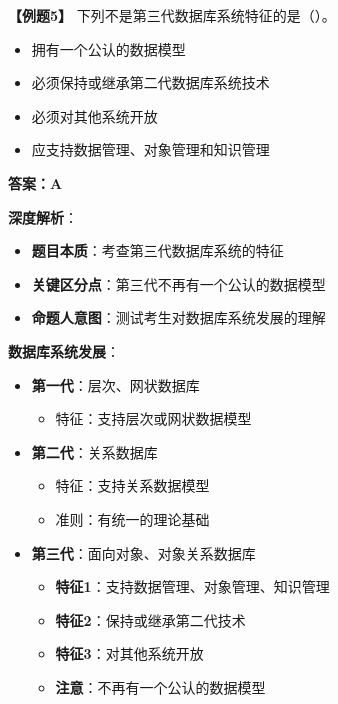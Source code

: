 \documentclass[12pt, a4paper]{article}
\newenvironment{bluebox}[1]{%
  \begin{trivlist}
  \item[\hskip\labelsep \textbf{#1}]
  \setlength{\parskip}{0.5ex}
  \setlength{\itemsep}{0.5ex}
}{%
  \end{trivlist}
  }
\begin{document}
\begin{bluebox}{例题5：第三代数据库系统}
	\textbf{【例题5】} 下列不是第三代数据库系统特征的是（\quad）。

	\begin{itemize}
		\item[A)] 拥有一个公认的数据模型
		\item[B)] 必须保持或继承第二代数据库系统技术
		\item[C)] 必须对其他系统开放
		\item[D)] 应支持数据管理、对象管理和知识管理
	\end{itemize}

	\textbf{答案：A}

	\textbf{深度解析}：

	\begin{itemize}[leftmargin=*, nosep]
		\item \textbf{题目本质}：考查第三代数据库系统的特征
		\item \textbf{关键区分点}：第三代不再有一个公认的数据模型
		\item \textbf{命题人意图}：测试考生对数据库系统发展的理解
	\end{itemize}

	\textbf{数据库系统发展}：

	\begin{itemize}[leftmargin=*, nosep]
		\item \textbf{第一代}：层次、网状数据库
		      \begin{itemize}[nosep]
			      \item 特征：支持层次或网状数据模型
		      \end{itemize}

		\item \textbf{第二代}：关系数据库
		      \begin{itemize}[nosep]
			      \item 特征：支持关系数据模型
			      \item 准则：有统一的理论基础
		      \end{itemize}

		\item \textbf{第三代}：面向对象、对象关系数据库
		      \begin{itemize}[nosep]
			      \item \textbf{特征1}：支持数据管理、对象管理、知识管理
			      \item \textbf{特征2}：保持或继承第二代技术
			      \item \textbf{特征3}：对其他系统开放
			      \item \textbf{注意}：不再有一个公认的数据模型
		      \end{itemize}
	\end{itemize}


\end{bluebox}
\end{document}
